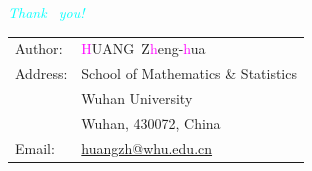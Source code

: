 \documentclass[notheorems,mathserif,table]{beamer}
\begin{document}
\begin{frame}
 \begin{center}
{\huge \emph{\textcolor{cyan}{Thank  ~you!}}}\\
\vspace{5mm}\large
\begin{tabular}{ll}
{\sc Author}:  & \textsf{\textcolor{magenta}{H}UANG\ Z\textcolor{magenta}{h}eng-\textcolor{magenta}{h}ua}\\
{\sc Address}: & School of Mathematics \& Statistics\\
               & Wuhan University  \\
               & Wuhan, 430072, China\\
  {\sc Email}: & \href{mailto:huangzh@whu.edu.cn}{\color{blue}huangzh@whu.edu.cn}\\
\end{tabular}
\end{center}
\end{frame}

\end{document}

